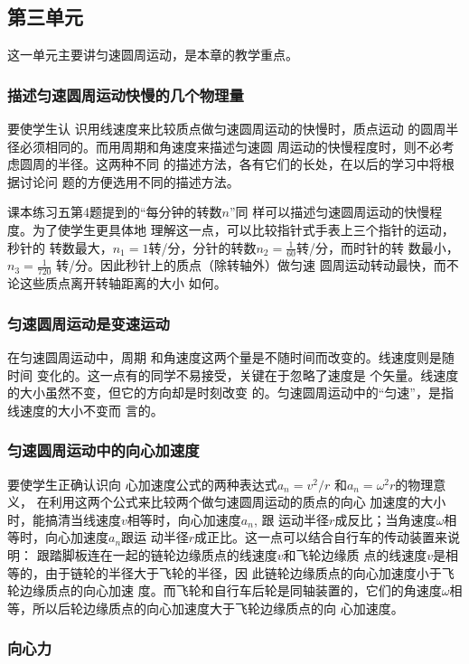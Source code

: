\subsection{第三单元}
这一单元主要讲匀速圆周运动，是本章的教学重点。
\subsubsection{描述匀速圆周运动快慢的几个物理量}
要使学生认
识用线速度来比较质点做匀速圆周运动的快慢时，质点运动
的圆周半径必须相同的。而用周期和角速度来描述匀速圆
周运动的快慢程度时，则不必考虑圆周的半径。这两种不同
的描述方法，各有它们的长处，在以后的学习中将根据讨论问
题的方便选用不同的描述方法。

课本练习五第4题提到的“每分钟的转数$n$”同
样可以描述匀速圆周运动的快慢程度。为了使学生更具体地
理解这一点，可以比较指针式手表上三个指针的运动，秒针的
转数最大，$n_1=1$转/分，分针的转数$n_2=\frac{1}{60}
$转/分，而时针的转
数最小，$n_3=\frac{1}{720}$
转/分。因此秒针上的质点（除转轴外）做匀速
圆周运动转动最快，而不论这些质点离开转轴距离的大小
如何。

\subsubsection{匀速圆周运动是变速运动}

在匀速圆周运动中，周期
和角速度这两个量是不随时间而改变的。线速度则是随时间
变化的。这一点有的同学不易接受，关键在于忽略了速度是
个矢量。线速度的大小虽然不变，但它的方向却是时刻改变
的。匀速圆周运动中的“匀速”，是指线速度的大小不变而
言的。

\subsubsection{匀速圆周运动中的向心加速度}

要使学生正确认识向
心加速度公式的两种表达式$a_n=v^2/r$
和$a_n=\omega^2 r$的物理意义，
在利用这两个公式来比较两个做匀速圆周运动的质点的向心
加速度的大小时，能搞清当线速度$v$相等时，向心加速度$a_n$, 跟
运动半径$r$成反比；当角速度$\omega$相等时，向心加速度$a_n$跟运
动半径$r$成正比。这一点可以结合自行车的传动装置来说明：
跟踏脚板连在一起的链轮边缘质点的线速度$v$和飞轮边缘质
点的线速度$v$是相等的，由于链轮的半径大于飞轮的半径，因
此链轮边缘质点的向心加速度小于飞轮边缘质点的向心加速
度。而飞轮和自行车后轮是同轴装置的，它们的角速度$\omega$相
等，所以后轮边缘质点的向心加速度大于飞轮边缘质点的向
心加速度。

\subsubsection{向心力}

